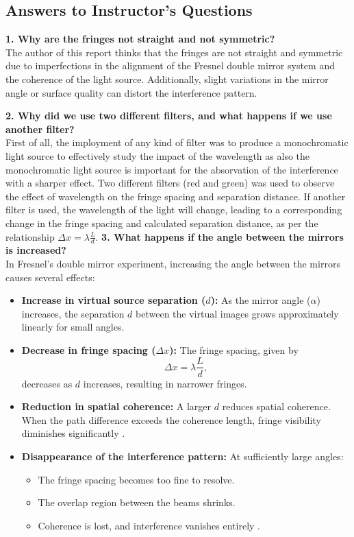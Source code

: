 \documentclass[journal]{IEEEtran}
\begin{document}
\subsection{Answers to Instructor's Questions}
\textbf{1. Why are the fringes not straight and not symmetric?} \\
The author of this report thinks that the fringes are not straight and symmetric due to imperfections in the alignment of the Fresnel double mirror system and the coherence of the light source. Additionally, slight variations in the mirror angle or surface quality can distort the interference pattern.

\textbf{2. Why did we use two different filters, and what happens if we use another filter?} \\
First of all, the imployment of any kind of filter was to produce a monochromatic light source to effectively study the impact of the wavelength as also the monochromatic light source is important for the absorvation of the interference with a sharper effect. Two different filters (red and green) was used to observe the effect of wavelength on the fringe spacing and separation distance. If another filter is used, the wavelength of the light will change, leading to a corresponding change in the fringe spacing and calculated separation distance, as per the relationship $\Delta x = \lambda \frac{L}{d}$.
\textbf{3. What happens if the angle between the mirrors is increased?} \\

In Fresnel's double mirror experiment, increasing the angle between the mirrors causes several effects:
\begin{itemize}
    \item \textbf{Increase in virtual source separation ($d$):} As the mirror angle ($\alpha$) increases, the separation $d$ between the virtual images grows approximately linearly for small angles.
    
    \item \textbf{Decrease in fringe spacing ($\Delta x$):} The fringe spacing, given by
    \[
    \Delta x = \lambda \frac{L}{d},
    \]
    decreases as $d$ increases, resulting in narrower fringes.
    
    \item \textbf{Reduction in spatial coherence:} A larger $d$ reduces spatial coherence. When the path difference exceeds the coherence length, fringe visibility diminishes significantly \cite{mustansiriyah_wavefront}.
    
    \item \textbf{Disappearance of the interference pattern:} At sufficiently large angles:
    \begin{itemize}
        \item The fringe spacing becomes too fine to resolve.
        \item The overlap region between the beams shrinks.
        \item Coherence is lost, and interference vanishes entirely \cite{mustansiriyah_wavefront}.
    \end{itemize}
\end{itemize}
\end{document}

